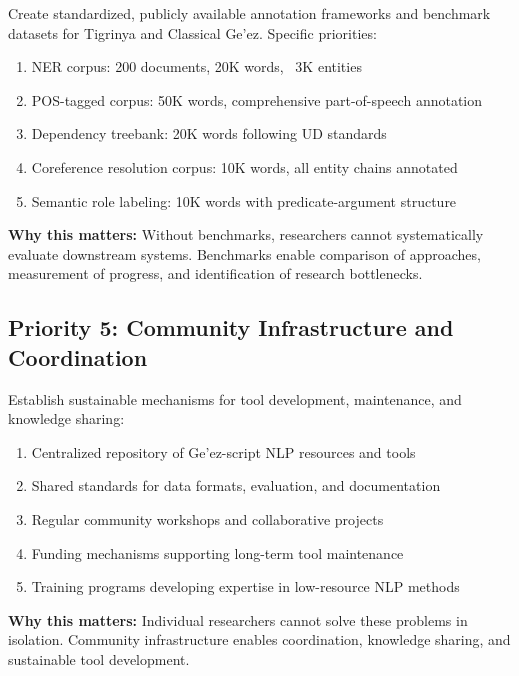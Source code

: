 \documentclass[12pt,a4paper]{article}
\theoremstyle{plain}
\theoremstyle{definition}
\begin{document}
Create standardized, publicly available annotation frameworks and benchmark datasets for Tigrinya and Classical Ge'ez. Specific priorities:

\begin{enumerate}
\item NER corpus: 200 documents, 20K words, ~3K entities
\item POS-tagged corpus: 50K words, comprehensive part-of-speech annotation
\item Dependency treebank: 20K words following UD standards
\item Coreference resolution corpus: 10K words, all entity chains annotated
\item Semantic role labeling: 10K words with predicate-argument structure
\end{enumerate}

\textbf{Why this matters:} Without benchmarks, researchers cannot systematically evaluate downstream systems. Benchmarks enable comparison of approaches, measurement of progress, and identification of research bottlenecks.

\subsection{Priority 5: Community Infrastructure and Coordination}

Establish sustainable mechanisms for tool development, maintenance, and knowledge sharing:

\begin{enumerate}
\item Centralized repository of Ge'ez-script NLP resources and tools
\item Shared standards for data formats, evaluation, and documentation
\item Regular community workshops and collaborative projects
\item Funding mechanisms supporting long-term tool maintenance
\item Training programs developing expertise in low-resource NLP methods
\end{enumerate}

\textbf{Why this matters:} Individual researchers cannot solve these problems in isolation. Community infrastructure enables coordination, knowledge sharing, and sustainable tool development.

\end{document}
